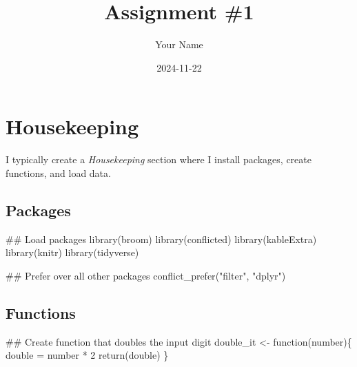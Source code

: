 \documentclass[
  12pt,
  letterpaper,
  DIV=11,
  numbers=noendperiod]{scrartcl}
\title{Assignment \#1}
\author{Your Name}
\date{2024-11-22}
\newenvironment{Shaded}{}{}
\newcommand{\ControlFlowTok}[1]{\textcolor[rgb]{0.65,0.15,0.64}{#1}}
\newcommand{\DecValTok}[1]{\textcolor[rgb]{0.60,0.41,0.00}{#1}}
\newcommand{\DocumentationTok}[1]{\textcolor[rgb]{0.89,0.34,0.29}{#1}}
\newcommand{\FunctionTok}[1]{\textcolor[rgb]{0.25,0.47,0.95}{#1}}
\newcommand{\NormalTok}[1]{\textcolor[rgb]{0.22,0.23,0.26}{#1}}
\newcommand{\OtherTok}[1]{\textcolor[rgb]{0.15,0.68,0.38}{#1}}
\newcommand{\SpecialCharTok}[1]{\textcolor[rgb]{0.00,0.52,0.74}{#1}}
\newcommand{\StringTok}[1]{\textcolor[rgb]{0.31,0.63,0.31}{#1}}
\renewcommand*\contentsname{Table of contents}
\newcommand\contentsname{Table of contents}
\begin{document}
\maketitle
\ifdefined\Shaded\renewenvironment{Shaded}{\begin{tcolorbox}[sharp corners, frame hidden, colback={codebgcolor}, borderline west={3pt}{0pt}{shadecolor}, boxrule=0pt, enhanced, breakable]}{\end{tcolorbox}}\fi

\renewcommand*\contentsname{Contents}
{
\hypersetup{linkcolor=}
\setcounter{tocdepth}{1}
\tableofcontents
}
\newpage

\hypertarget{housekeeping}{%
\section{Housekeeping}\label{housekeeping}}

I typically create a \emph{Housekeeping} section where I install
packages, create functions, and load data.

\hypertarget{packages}{%
\subsection{Packages}\label{packages}}

\begin{Shaded}
\begin{Highlighting}[]
\DocumentationTok{\#\# Load packages}
\FunctionTok{library}\NormalTok{(broom)}
\FunctionTok{library}\NormalTok{(conflicted)}
\FunctionTok{library}\NormalTok{(kableExtra)}
\FunctionTok{library}\NormalTok{(knitr)}
\FunctionTok{library}\NormalTok{(tidyverse)}

\DocumentationTok{\#\# Prefer over all other packages}
\FunctionTok{conflict\_prefer}\NormalTok{(}\StringTok{"filter"}\NormalTok{, }\StringTok{"dplyr"}\NormalTok{)}
\end{Highlighting}
\end{Shaded}

\hypertarget{functions}{%
\subsection{Functions}\label{functions}}

\begin{Shaded}
\begin{Highlighting}[]
\DocumentationTok{\#\# Create function that doubles the input digit}
\NormalTok{double\_it }\OtherTok{\textless{}{-}} \ControlFlowTok{function}\NormalTok{(number)\{}
\NormalTok{  double }\OtherTok{=}\NormalTok{ number }\SpecialCharTok{*} \DecValTok{2}
  \FunctionTok{return}\NormalTok{(double)}
\NormalTok{\}}
\end{Highlighting}
\end{Shaded}
\end{document}
